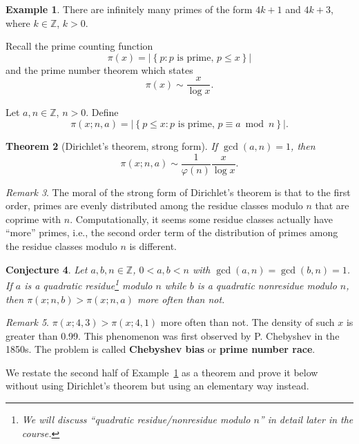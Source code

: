 \documentclass{amsbook}
\theoremstyle{plain}
\newtheorem{theorem}{Theorem}[chapter] %
\newtheorem{conjecture}[theorem]{Conjecture}
\theoremstyle{definition}
\newtheorem{example}[theorem]{Example}
\theoremstyle{remark}
\newtheorem{remark}[theorem]{Remark}
\numberwithin{equation}{chapter}
\numberwithin{figure}{chapter}
\newcommand{\Z}{\mathbb{Z}}
\begin{document}
\begin{example}\label{ex:ex2_day11}
  There are infinitely many primes of the form $4k+1$ and $4k+3$, where $k \in \Z$, $k > 0$.
\end{example}

Recall the prime counting function
\[
\pi (x) = | \left\{ p : \text{$p$ is prime, $p \leqslant x$} \right\} |
\]
and the prime number theorem which states 
\[
\pi (x) \sim \frac{x}{\log x}.
\] 

Let $a, n \in \Z$, $n > 0$. Define 
\[
\pi (x; n, a) = | \left\{ p \leqslant x : \text{$p$ is prime, } p \equiv a \bmod n \right\} |.
\]

\begin{theorem}[Dirichlet's theorem, strong form]
If $\gcd (a, n) = 1$, then 
\[
\pi (x; n, a) \sim \frac{1}{\varphi(n)} \frac{x}{\log x}.
\]
\end{theorem}

\begin{remark}
  The moral of the strong form of Dirichlet's theorem is that to the first order, primes are evenly distributed among the residue classes modulo $n$ that are coprime with $n$. Computationally, it seems some residue classes actually have ``more'' primes, i.e., the second order term of the distribution of primes among the residue classes modulo $n$ is different.
\end{remark}

\begin{conjecture}
   Let $a, b, n \in \Z$, $0 < a, b < n$ with $\gcd (a, n) = \gcd (b, n) = 1$. If $a$ is a quadratic residue\footnote{We will discuss ``quadratic residue/nonresidue modulo $n$'' in detail later in the course.} modulo $n$ while $b$ is a quadratic nonresidue modulo $n$, then $\pi (x; n, b) > \pi (x; n, a)$ more often than not.
\end{conjecture}
\begin{remark}
  $\pi (x; 4, 3) > \pi (x; 4, 1)$ more often than not. The density of such $x$ is greater than 0.99. This phenomenon was first observed by P. Chebyshev in the 1850s. The problem is called \textbf{Chebyshev bias} or \textbf{prime number race}.
\end{remark}

We restate the second half of Example~\ref{ex:ex2_day11} as a theorem and prove it below without using Dirichlet's theorem but using an elementary way instead.
\end{document}
